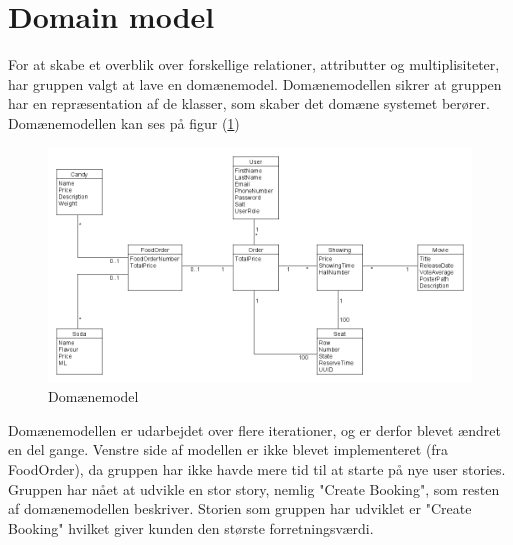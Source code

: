 ﻿\section{Domain model}
For at skabe et overblik over forskellige relationer, attributter og multiplisiteter, 
har gruppen valgt at lave en domænemodel.
Domænemodellen sikrer at gruppen har en repræsentation af de klasser, som skaber det domæne systemet berører.\\

Domænemodellen kan ses på figur (\ref{fig:domain})

\begin{figure}[H]
    \centering
    \includegraphics[width=1\textwidth]{figures/Domainmodel.png}
    \caption{Domænemodel}
    \label{fig:domain}
\end{figure}

Domænemodellen er udarbejdet over flere iterationer, og er derfor blevet ændret en del gange.
Venstre side af modellen er ikke blevet implementeret (fra FoodOrder), 
da gruppen har ikke havde mere tid til at starte på nye user stories. 
Gruppen har nået at udvikle en stor story, nemlig "Create Booking", 
som resten af domænemodellen beskriver. Storien som gruppen har udviklet er "Create Booking" 
hvilket giver kunden den største forretningsværdi.  \\